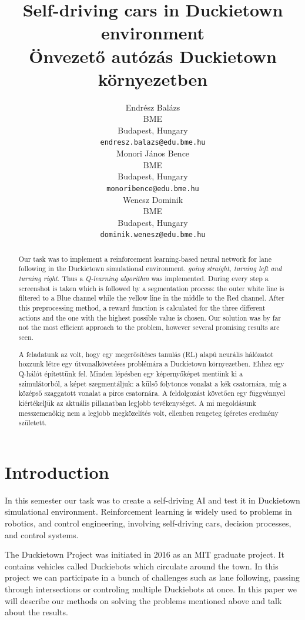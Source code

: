 \documentclass{article}
\title{Self-driving cars in Duckietown environment\\[10pt]Önvezető autózás Duckietown környezetben}
\author{
  Endrész Balázs \\
  BME \\
  Budapest, Hungary\\
  \texttt{endresz.balazs@edu.bme.hu} \\
  \And
  Monori János Bence \\
  BME \\
  Budapest, Hungary \\  
  \texttt{monoribence@edu.bme.hu} \\
  \AND
  Wenesz Dominik \\
  BME \\
  Budapest, Hungary \\
  \texttt{dominik.wenesz@edu.bme.hu} \\
}
\begin{document}
\maketitle

\begin{abstract}
  Our task was to implement a reinforcement learning-based neural
  network for lane following in the Duckietown simulational environment.
  \textit{going straight, turning left and turning right}. Thus a \textit{Q-learning algorithm}
  was implemented. During every step a screenshot is taken which is followed by a segmentation
  process: the outer white line is filtered to a Blue channel while the yellow line
  in the middle to the Red channel. After this preprocessing method, a reward function is calculated
  for the three different actions and the one with the highest possible value is chosen.
  Our solution was by far not the most efficient approach to the problem, however several
  promising results are seen. \par
  A feladatunk az volt, hogy egy megerősítéses tanulás (RL) alapú neurális hálózatot
  hozzunk létre egy útvonalkövetéses problémára a Duckietown környezetben. Ehhez egy
  Q-hálót építettünk fel. Minden lépésben egy képernyőképet mentünk ki a szimulátorból,
  a képet szegmentáljuk: a külső folytonos vonalat a kék csatornára, míg a középső szaggatott
  vonalat a piros csatornára. A feldolgozást követően egy függvénnyel kiértékeljük az aktuális
  pillanatban legjobb tevékenységet. A mi megoldásunk messzemenőkig nem a legjobb megközelítés volt,
  ellenben rengeteg ígéretes eredmény született.
\end{abstract}

\section{Introduction}

\thispagestyle{empty}
In this semester our task was to create a self-driving AI and test it in  Duckietown
simulational environment. Reinforcement learning is widely used to problems in robotics,
and control engineering, involving self-driving cars, decision processes, and control systems. 
\par
The Duckietown Project was initiated in 2016 as an MIT graduate project. It contains
vehicles called Duckiebots which circulate around the town. In this project we can participate
in a bunch of challenges such as lane following, passing through intersections or controling
multiple Duckiebots at once. In this paper we will describe our methods on solving the
problems mentioned above and talk about the results.
\end{document}
